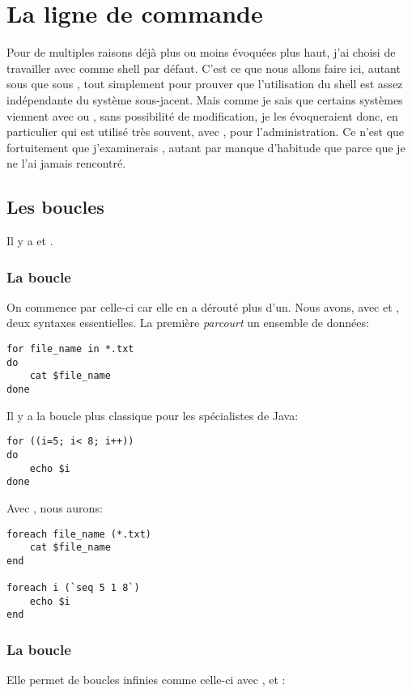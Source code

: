 
\section{La ligne de commande}
Pour de multiples raisons déjà plus ou moins évoquées plus haut, j'ai choisi de travailler avec \zsh{} comme shell par défaut. C'est ce que nous allons faire ici, autant sous \freebsd{} que sous \linux{}, tout simplement pour prouver que l'utilisation du shell est assez indépendante du système sous-jacent. Mais comme je sais que certains systèmes viennent avec \bash{} ou \tcsh{}, sans possibilité de modification, je les évoqueraient donc, en particulier \tcsh{} qui est utilisé très souvent, avec \csh{}, pour l'administration. Ce n'est que fortuitement que j'examinerais \ksh{},  autant par manque d'habitude que parce que je ne l'ai jamais rencontré.

\subsection{Les boucles}
Il y a  et .

\subsubsection{La boucle }
On commence par celle-ci car elle en a dérouté plus d'un. Nous avons, avec \zsh{} et \bash, deux syntaxes essentielles. La première \emph{parcourt} un ensemble de données:

\begin{lstlisting}
for file_name in *.txt
do
	cat $file_name
done
\end{lstlisting}

Il y a la boucle plus classique pour les spécialistes de Java:

\begin{lstlisting}
for ((i=5; i< 8; i++))
do
	echo $i
done
\end{lstlisting}

Avec \tcsh{}, nous aurons:

\begin{lstlisting}
foreach file_name (*.txt)
	cat $file_name
end

foreach i (`seq 5 1 8`)
	echo $i
end
\end{lstlisting}


\subsubsection{La boucle }
Elle permet de boucles infinies comme celle-ci avec \zsh{}, \bash{} et \ksh{}:

